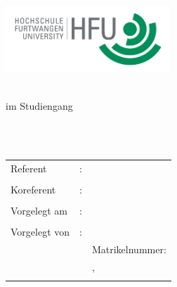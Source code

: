 \begin{titlepage}
\pagestyle{empty}

\begin{minipage}{0.45\textwidth}
	\flushleft
\end{minipage}
\hfill
\begin{minipage}{0.45\textwidth}
	\flushright
	\includegraphics[height=2.5cm]{content/logos/hfu.jpg}
\end{minipage}
\vspace*{2em}

\begin{center}
{\fontsize{18}{22}\selectfont \docArtDerArbeit}\\[5mm]
{\fontsize{18}{22}\selectfont im Studiengang} \\[5mm]
{\fontsize{18}{22}\selectfont \docStudiengang}\\
\vspace*{4em}
\begin{onehalfspace}
{\fontsize{22}{26}\selectfont \textbf{\docTitel}}\\[5mm]
{\fontsize{18}{22}\selectfont \docUntertitel}
\end{onehalfspace}
\end{center}

\vfill
\begin{center}
\begin{tabular}{lcl}
Referent  		&:& \docErsterReferent 	\\ \\
Koreferent 		&:& \docZweiterReferent \\ \\
Vorgelegt am 	&:& \docAbgabedatum 	\\ \\
Vorgelegt von 	&:& \docVorname{} \docNachname\\
				& & Matrikelnummer: \docMatrikelnummer\\
				& & \docStrasse, \docPlz{} \docOrt\\
				& & \docEmail		
\end{tabular}
\end{center}
\end{titlepage}
